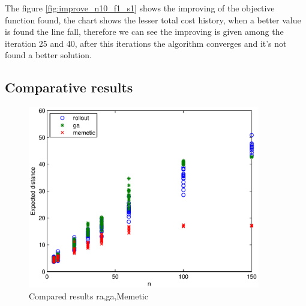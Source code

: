 
The figure \ref{fig:improve_n10_f1_s1} shows the improving of the objective function found, the chart shows the lesser total cost history, when a better value is found the line fall, therefore we can see the improving is given among the iteration 25 and 40, after this iterations the algorithm converges and it's not found a better solution.





\subsection{Comparative results}

\begin{figure}[!htbp]
  \begin{center}
   \includegraphics[width=0.9\textwidth]{Images/Chapter5/comparative_results.eps}
  \end{center}
    \caption{Compared results ra,ga,Memetic}\label{fig:comparative_results}
\end{figure}


